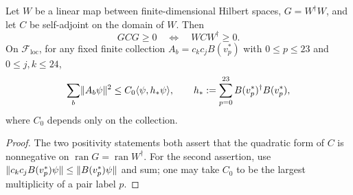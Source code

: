 \begin{lemma}\label{rb:lem:compression}
Let $W$ be a linear map between finite-dimensional Hilbert spaces,
$G=W^\dagger W$, and let $C$ be self-adjoint on the domain of $W$. Then
\[
 GCG\ge0\quad\Longleftrightarrow\quad WCW^\dagger\ge0.
\]
On $\mathcal F_{\mathrm{loc}}$, for any fixed finite collection
$A_b=c_kc_jB(v_p^*)$ with $0\le p\le23$ and $0\le j,k\le24$,
\begin{equation}\label{rb:eq:annihilatorbound}
 \sum_b\lVert A_b\psi\rVert^2\le C_0\langle \psi,h_*\psi\rangle,
 \qquad h_*:=\sum_{p=0}^{23}B(v_p^*)^\dagger B(v_p^*),
\end{equation}
where $C_0$ depends only on the collection.
\end{lemma}
\begin{proof}
The two positivity statements both assert that the quadratic form of $C$
is nonnegative on $\operatorname{ran} G=\operatorname{ran} W^\dagger$.  For the second assertion, use
$\lVert c_kc_jB(v_p^*)\psi\rVert\le\lVert B(v_p^*)\psi\rVert$ and sum; one may take
$C_0$ to be the largest multiplicity of a pair label $p$.
\end{proof}

